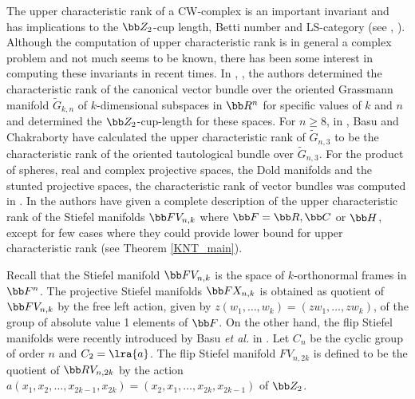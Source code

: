 The upper characteristic rank of a CW-complex is an important invariant and has implications to the $\bb Z_2$-cup length, Betti number and LS-category (see \cite{KNT2012}, \cite{korbas2014}). Although the computation of upper characteristic rank is in general a complex problem and not much seems to be known, there has been some interest in computing these invariants in recent times. In \cite{Korbaš2015}, \cite{PETROVIC2017}, the authors determined the characteristic rank of the canonical vector bundle over the oriented Grassmann manifold $\tilde{G}_{k,n}$ of $k$-dimensional subspaces in $\bb R^n$ for specific values of $k$ and $n$ and determined the $\bb Z_2$-cup-length for these spaces. For $n\ge 8$, in \cite{BC2020}, Basu and Chakraborty have calculated the upper characteristic rank of $\tilde{G}_{n,3}$ to be the characteristic rank of the oriented tautological bundle over $\tilde{G}_{n,3}$. For the product of spheres, real and complex projective spaces, the Dold manifolds and the stunted projective spaces, the characteristic rank of vector bundles was computed in \cite{NT2014}. In \cite{KNT2012} the authors have given a complete description of the upper characteristic rank of the Stiefel manifolds $\bb FV_{n,k}$ where $\bb F=\bb R, \bb C$ or $\bb H$, except for few cases where they could provide lower bound for upper characteristic rank (see Theorem \ref{KNT_main}).   

 Recall that the Stiefel manifold $\bb FV_{n, k}$ is the space of $k$-orthonormal frames in $\bb F^n$. The projective Stiefel manifolds $\bb FX_{n, k}$ is obtained as quotient of $\bb FV_{n, k}$ by the free left action, given by $z(w_1, \dots, w_k)=(zw_1, \dots, zw_k)$, of the group of absolute value 1 elements of $\bb F$. On the other hand, the flip Stiefel manifolds were recently introduced by Basu \textit{et al.} in \cite{BFG2023}. Let $C_n$ be the cyclic group of order $n$ and $C_2= \lra{a}$. The flip Stiefel manifold $FV_{n, 2k}$ is defined to be the quotient of $\bb RV_{n,2k}$ by the action $a(x_1,x_2,\ldots, x_{2k-1}, x_{2k}) =(x_2, x_1,\ldots, x_{2k}, x_{2k-1})$ of $\bb Z_2$.

